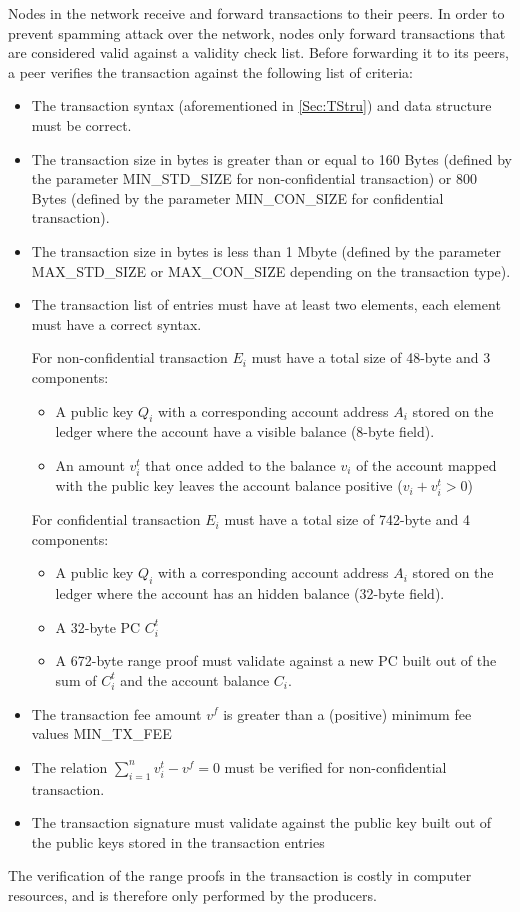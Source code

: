 Nodes in the network receive and forward transactions to their peers. In order to prevent spamming attack over the network,  nodes only forward transactions that are considered valid against a validity check list. Before forwarding it to its peers, a peer verifies the transaction against the following list of criteria:
 
\begin{itemize}
\item The transaction syntax (aforementioned in \ref{Sec:TStru}) and data structure must be correct.
\item The transaction size in bytes is greater than or equal to 160 Bytes (defined by the parameter MIN\_STD\_SIZE for non-confidential transaction) or 800 Bytes (defined by the parameter MIN\_CON\_SIZE for confidential transaction).
\item The transaction size in bytes is less than 1 Mbyte (defined by the parameter MAX\_STD\_SIZE or MAX\_CON\_SIZE depending on the transaction type).
\item The transaction list of entries must have at least two elements, each element must have a correct syntax. 

For non-confidential transaction $E_i$ must have a total size of 48-byte and 3 components:
\begin{itemize}
\item A public key $Q_i$ with a corresponding account address $A_i$ stored on the ledger where the account have a visible balance (8-byte field).
\item An amount $v_i^t$ that once added to the balance $v_i$ of the account mapped with the public key leaves the account balance positive ($v_i+v_i^t > 0$)
\end{itemize}
For confidential transaction $E_i$ must have a total size of 742-byte and 4 components:

\begin{itemize}
\item A public key $Q_i$ with a corresponding account address $A_i$ stored on the ledger where the account has an hidden balance (32-byte field).   
\item A 32-byte PC $C_i^t$ 
\item A 672-byte range proof must validate against a new PC built out of the sum of $C_i^t$ and the account balance $C_i$. 
\end{itemize}

\item The transaction fee amount $v^f$ is greater than a (positive) minimum fee values MIN\_TX\_FEE
\item The relation $\sum_{i=1}^{n}v^t_i - v^f = 0$ must be verified for non-confidential transaction.
\item The transaction signature must validate against the public key built out of the public keys stored in the transaction entries 
\end{itemize}

The verification of the range proofs in the transaction is costly in computer resources, and is therefore only performed by the producers. 